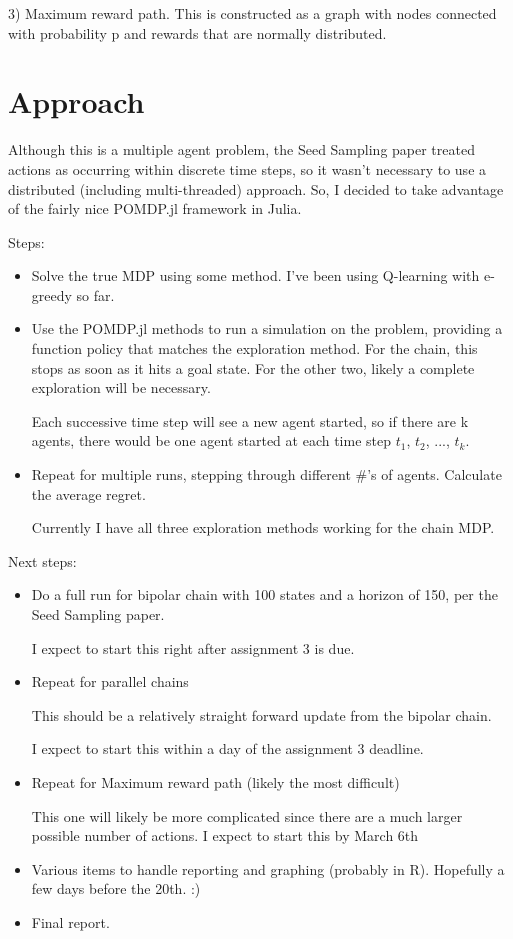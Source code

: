 \documentclass{article}
\begin{document}
3) Maximum reward path. This is constructed as a graph with nodes connected with probability p and rewards that are normally distributed.

\section{Approach}
Although this is a multiple agent problem, the Seed Sampling paper treated actions as occurring within discrete time steps, so it wasn't necessary to use a distributed (including multi-threaded) approach. So, I decided to take advantage of the fairly nice POMDP.jl framework in Julia. 

Steps:

  \begin{itemize}
  
\item Solve the true MDP using some method. I've been using Q-learning with e-greedy so far.
  
\item Use the POMDP.jl methods to run a simulation on the problem, providing a function policy that matches the exploration method. For the chain, this stops as soon as it hits a goal state. For the other two, likely a complete exploration will be necessary.

Each successive time step will see a new agent started, so if there are k agents, there would be one agent started at each time step $t_1$, $t_2$, ..., $t_k$.
\item Repeat for multiple runs, stepping through different \#'s of agents. Calculate the average regret.

  
  Currently I have all three exploration methods working for the chain MDP.
  
 \end{itemize}
  Next steps:
  \begin{itemize}
\item Do a full run for bipolar chain with 100 states and a horizon of 150, per the Seed Sampling paper.

I expect to start this right after assignment 3 is due.

\item Repeat for parallel chains

This should be a relatively straight forward update from the bipolar chain.  

I expect to start this within a day of the assignment 3 deadline.

\item Repeat for Maximum reward path (likely the most difficult)

This one will likely be more complicated since there are a much larger possible number of actions. I expect to start this by March 6th

\item Various items to handle reporting and graphing (probably in R). Hopefully a few days before the 20th. :)

\item Final report.
 \end{itemize}
\end{document}
